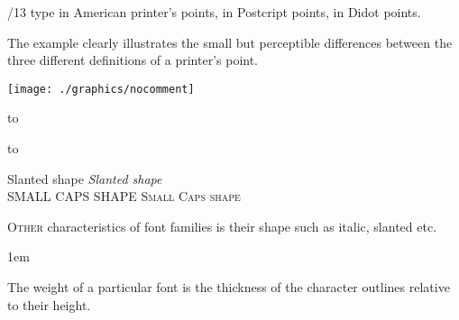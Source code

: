 \begin{minipage}{5cm}
\fontsize{11}{13}/13 type in American printer's points, 
\fontsize{11bp}{13bp}\selectfont in Postcript points, 
\fontsize{11dd}{13dd}\selectfont in Didot points. 
\end{minipage}
\bottomline



The example clearly illustrates the small but perceptible differences between the three different definitions of a printer's point.

\clearpage

\setlength{\columnsep}{1em}
\begin{multicols}{3}


\texttt{[image: ./graphics/nocomment]}


\bigskip

{\small


\hbox to 

\hbox to 

Slanted shape          {\slshape Slanted shape}\\

SMALL CAPS SHAPE  {\scshape Small Caps shape}\\
}

\columnbreak


\lettrine{O}{ther} characteristics of font families is their shape such as italic, slanted etc.


\parindent1em




The weight of a particular font is the thickness of the character outlines relative to their height.


\end{multicols}
